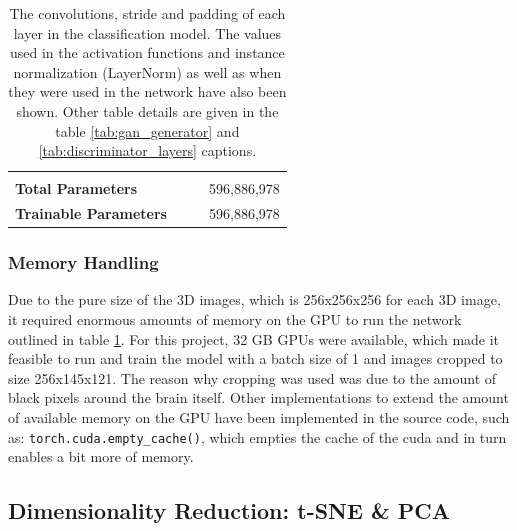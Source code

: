 \documentclass[11pt, fleqn, titlepage]{article}
\newcommand{\1}[1]{\mathds{1}\left[#1\right]}
\begin{document}
\begin{table}[H]
\begin{tabular}{llll}
			&                &             &               \\
			\textbf{Total Parameters}                   &                &             & 596,886,978    \\
			\textbf{Trainable Parameters}               &                &             & 596,886,978    \\ \bottomrule
		\end{tabular}
		\caption{The convolutions, stride and padding of each layer in the classification model. The values used in the activation functions and instance normalization (LayerNorm) as well as when they were used in the network have also been shown. Other table details are given in the table \ref{tab:gan_generator} and \ref{tab:discriminator_layers} captions.}
		\label{cnn_arcitecture}
\end{table}	

	\subsubsection{Memory Handling}
	Due to the pure size of the 3D images, which is 256x256x256 for each 3D image, it required enormous amounts of memory on the GPU to run the network outlined in table \ref{cnn_arcitecture}. For this project, 32 GB GPUs were available, which made it feasible to run and train the model with a batch size of 1 and images cropped to size 256x145x121. The reason why cropping was used was due to the amount of black pixels around the brain itself. Other implementations to extend the amount of available memory on the GPU have been implemented in the source code, such as: \texttt{torch.cuda.empty\_cache()}, which empties the cache of the cuda and in turn enables a bit more of memory.



\subsection{Dimensionality Reduction: t-SNE \& PCA}
\end{document}
